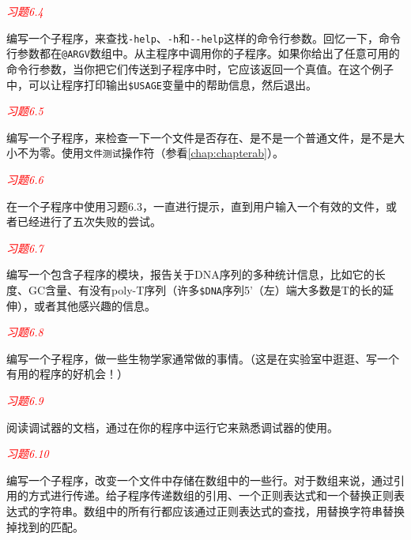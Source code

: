 \textcolor{red}{\textit{习题6.4}}
\begin{adjustwidth}{1cm}{}
编写一个子程序，来查找\verb|-help|、\verb|-h|和\verb|--help|这样的命令行参数。回忆一下，命令行参数都在\verb|@ARGV|数组中。从主程序中调用你的子程序。如果你给出了任意可用的命令行参数，当你把它们传送到子程序中时，它应该返回一个真值。在这个例子中，可以让程序打印输出\verb|$USAGE|变量中的帮助信息，然后退出。
\end{adjustwidth}

\textcolor{red}{\textit{习题6.5}}
\begin{adjustwidth}{1cm}{}
编写一个子程序，来检查一下一个文件是否存在、是不是一个普通文件，是不是大小不为零。使用\verb|文件测试|操作符（参看\autoref{chap:chapterab}）。
\end{adjustwidth}

\textcolor{red}{\textit{习题6.6}}
\begin{adjustwidth}{1cm}{}
在一个子程序中使用习题6.3，一直进行提示，直到用户输入一个有效的文件，或者已经进行了五次失败的尝试。
\end{adjustwidth}

\textcolor{red}{\textit{习题6.7}}
\begin{adjustwidth}{1cm}{}
编写一个包含子程序的模块，报告关于DNA序列的多种统计信息，比如它的长度、GC含量、有没有poly-T序列（许多\verb|$DNA|序列5'（左）端大多数是T的长的延伸），或者其他感兴趣的信息。
\end{adjustwidth}

\textcolor{red}{\textit{习题6.8}}
\begin{adjustwidth}{1cm}{}
编写一个子程序，做一些生物学家通常做的事情。（这是在实验室中逛逛、写一个有用的程序的好机会！）
\end{adjustwidth}

\textcolor{red}{\textit{习题6.9}}
\begin{adjustwidth}{1cm}{}
阅读调试器的文档，通过在你的程序中运行它来熟悉调试器的使用。
\end{adjustwidth}

\textcolor{red}{\textit{习题6.10}}
\begin{adjustwidth}{1cm}{}
编写一个子程序，改变一个文件中存储在数组中的一些行。对于数组来说，通过引用的方式进行传递。给子程序传递数组的引用、一个正则表达式和一个替换正则表达式的字符串。数组中的所有行都应该通过正则表达式的查找，用替换字符串替换掉找到的匹配。
\end{adjustwidth}
